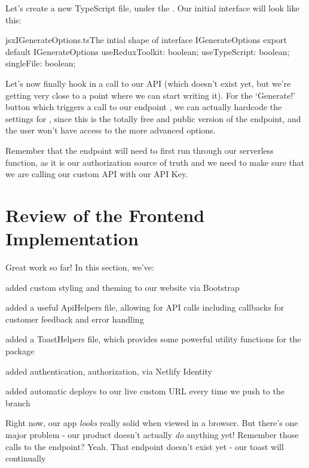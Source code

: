 \documentclass[paper=6in:9in,pagesize=pdftex,headinclude=on,footinclude=on,12pt]{scrbook}
\begin{document}

Let's create a new TypeScript file,  under the . Our initial  interface will look like this:

\begin{codeInput}{jsx}{IGenerateOptions.ts}{The intial shape of interface IGenerateOptions}
export default IGenerateOptions {
  useReduxToolkit: boolean;
  useTypeScript: boolean;
  singleFile: boolean;
}
\end{codeInput}

Let's now finally hook in a call to our API (which doesn't exist yet, but we're getting very close to a point where we can start writing it). For the `Generate!' button which triggers a call to our endpoint , we can actually hardcode the settings for , since this is the totally free and public version of the endpoint, and the user won't have access to the more advanced options.

Remember that the  endpoint will need to first run through our serverless function, as it is our authorization source of truth and we need to make sure that we are calling our custom API with our API Key.

\section{Review of the Frontend Implementation}

Great work so far! In this section, we've: 

\begin{arrows}
\item added custom styling and theming to our website via Bootstrap
\item added a useful ApiHelpers file, allowing for API calls including callbacks for customer feedback and error handling
\item added a ToastHelpers file, which provides some powerful utility functions for the  package
\item added authentication, authorization, via Netlify Identity
\item added automatic deploys to our live custom URL every time we push to the  branch
\end{arrows}

Right now, our app \textit{looks} really solid when viewed in a browser. But there's one major problem - our product doesn't actually \textit{do} anything yet! \joy Remember those calls to the  endpoint? Yeah. That endpoint doesn't exist yet - our toast will continually 
\end{document}
